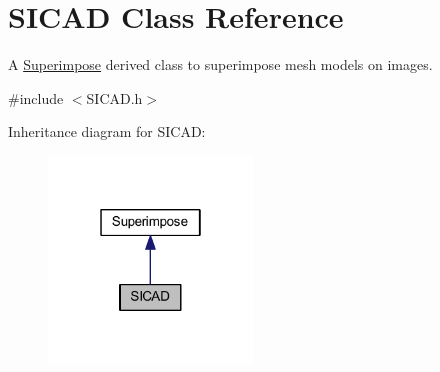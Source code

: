 \hypertarget{classSICAD}{}\section{S\+I\+C\+AD Class Reference}
\label{classSICAD}


A \mbox{\hyperlink{classSuperimpose}{Superimpose}} derived class to superimpose mesh models on images.  




{\ttfamily \#include $<$S\+I\+C\+A\+D.\+h$>$}



Inheritance diagram for S\+I\+C\+AD\+:\nopagebreak
\begin{figure}[H]
\begin{center}
\leavevmode
\includegraphics[width=154pt]{classSICAD__inherit__graph}
\end{center}
\end{figure}

